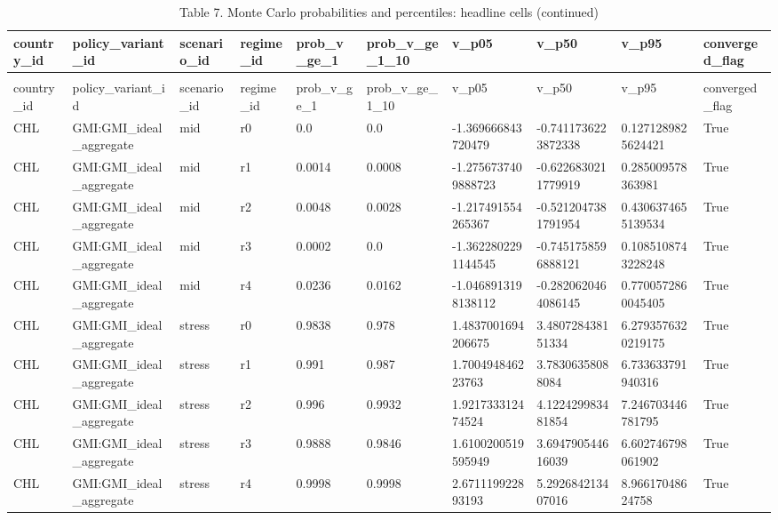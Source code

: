 \begin{landscape}
\fontsize{7}{8.4}\selectfont
\setlength{\tabcolsep}{2.2pt}
\begin{longtable}{llllllllll}
\caption{Table 7. Monte Carlo probabilities and percentiles: headline cells}\label{tab:results_mc}\\
\toprule
country\_id & policy\_variant\_id & scenario\_id & regime\_id & prob\_v\_ge\_1 & prob\_v\_ge\_1\_10 & v\_p05 & v\_p50 & v\_p95 & converged\_flag \\
\midrule
\endfirsthead
\caption[]{Table 7. Monte Carlo probabilities and percentiles: headline cells (continued)}\\
\toprule
country\_id & policy\_variant\_id & scenario\_id & regime\_id & prob\_v\_ge\_1 & prob\_v\_ge\_1\_10 & v\_p05 & v\_p50 & v\_p95 & converged\_flag \\
\midrule
\endhead
CHL & GMI:GMI\_ideal\_aggregate & mid & r0 & 0.0 & 0.0 & -1.369666843720479 & -0.7411736223872338 & 0.1271289825624421 & True \\
CHL & GMI:GMI\_ideal\_aggregate & mid & r1 & 0.0014 & 0.0008 & -1.2756737409888723 & -0.6226830211779919 & 0.285009578363981 & True \\
CHL & GMI:GMI\_ideal\_aggregate & mid & r2 & 0.0048 & 0.0028 & -1.217491554265367 & -0.5212047381791954 & 0.4306374655139534 & True \\
CHL & GMI:GMI\_ideal\_aggregate & mid & r3 & 0.0002 & 0.0 & -1.3622802291144545 & -0.7451758596888121 & 0.1085108743228248 & True \\
CHL & GMI:GMI\_ideal\_aggregate & mid & r4 & 0.0236 & 0.0162 & -1.0468913198138112 & -0.2820620464086145 & 0.7700572860045405 & True \\
CHL & GMI:GMI\_ideal\_aggregate & stress & r0 & 0.9838 & 0.978 & 1.4837001694206675 & 3.480728438151334 & 6.2793576320219175 & True \\
CHL & GMI:GMI\_ideal\_aggregate & stress & r1 & 0.991 & 0.987 & 1.700494846223763 & 3.78306358088084 & 6.733633791940316 & True \\
CHL & GMI:GMI\_ideal\_aggregate & stress & r2 & 0.996 & 0.9932 & 1.921733312474524 & 4.122429983481854 & 7.246703446781795 & True \\
CHL & GMI:GMI\_ideal\_aggregate & stress & r3 & 0.9888 & 0.9846 & 1.6100200519595949 & 3.694790544616039 & 6.602746798061902 & True \\
CHL & GMI:GMI\_ideal\_aggregate & stress & r4 & 0.9998 & 0.9998 & 2.671119922893193 & 5.292684213407016 & 8.96617048624758 & True \\

\end{longtable}
\end{landscape}

